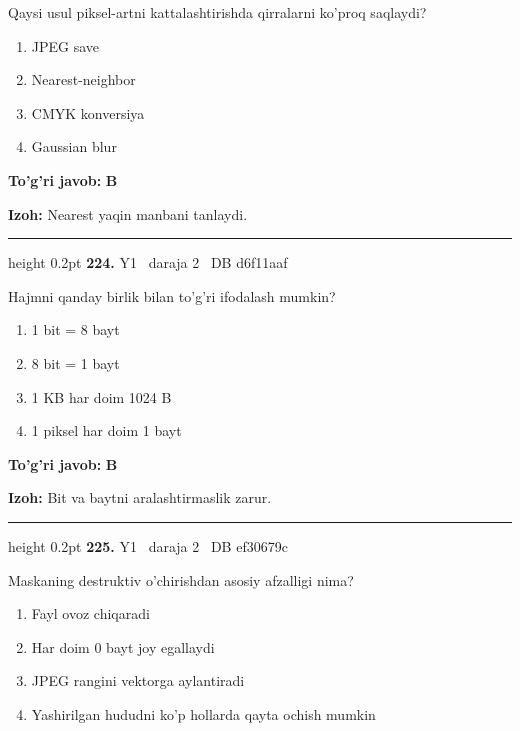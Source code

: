 \documentclass[10pt,a4paper,oneside]{article}
\begin{document}
\par
Qaysi usul piksel-artni kattalashtirishda qirralarni ko'proq saqlaydi?
\begin{enumerate}[label=\Alph*),leftmargin=9mm]
\item JPEG save
\item Nearest-neighbor
\item CMYK konversiya
\item Gaussian blur
\end{enumerate}
\begin{tcolorbox}[enhanced,breakable,colback=teal!4,colframe=teal!45!black,boxrule=0.45pt,arc=1.2mm,left=2.8mm,right=2.8mm,top=2mm,bottom=2mm,before skip=2mm,after skip=2mm]
\textbf{\color{teal}To'g'ri javob:} \textbf{B}
\par\smallskip
\textbf{Izoh:} Nearest yaqin manbani tanlaydi.
\end{tcolorbox}
\vspace{2mm}\hrule height 0.2pt \vspace{4mm}
\hypertarget{q224}{\textbf{\color{ink}224.}}  {\color{muted}\scriptsize Y1 \textbullet\ daraja 2 \textbullet\ DB d6f11aaf}
\par
Hajmni qanday birlik bilan to'g'ri ifodalash mumkin?
\begin{enumerate}[label=\Alph*),leftmargin=9mm]
\item 1 bit = 8 bayt
\item 8 bit = 1 bayt
\item 1 KB har doim 1024 B
\item 1 piksel har doim 1 bayt
\end{enumerate}
\begin{tcolorbox}[enhanced,breakable,colback=teal!4,colframe=teal!45!black,boxrule=0.45pt,arc=1.2mm,left=2.8mm,right=2.8mm,top=2mm,bottom=2mm,before skip=2mm,after skip=2mm]
\textbf{\color{teal}To'g'ri javob:} \textbf{B}
\par\smallskip
\textbf{Izoh:} Bit va baytni aralashtirmaslik zarur.
\end{tcolorbox}
\vspace{2mm}\hrule height 0.2pt \vspace{4mm}
\hypertarget{q225}{\textbf{\color{ink}225.}}  {\color{muted}\scriptsize Y1 \textbullet\ daraja 2 \textbullet\ DB ef30679c}
\par
Maskaning destruktiv o'chirishdan asosiy afzalligi nima?
\begin{enumerate}[label=\Alph*),leftmargin=9mm]
\item Fayl ovoz chiqaradi
\item Har doim 0 bayt joy egallaydi
\item JPEG rangini vektorga aylantiradi
\item Yashirilgan hududni ko'p hollarda qayta ochish mumkin
\end{enumerate}
\end{document}
